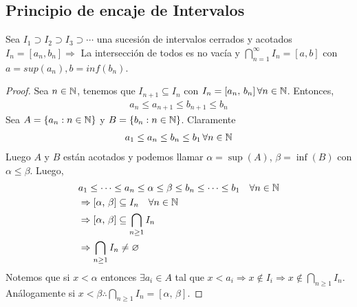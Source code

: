 \subsection{Principio de encaje de Intervalos}

\begin{theorem}
    Sea \(I_1 \supset I_2 \supset I_3 \supset \cdots\) una sucesión de intervalos cerrados y acotados \(I_n = [a_n, b_n] \Rightarrow\)
    La intersección de todos es no vacía y \(\bigcap_{n=1}^{\infty} I_n = [a,b]\) con \(a = sup(a_n), b=inf(b_n)\).
    \begin{proof}
        Sea \(n \in \mathbb{N}\), tenemos que \(I_{n+1} \subseteq I_n\) con \(I_n = [a_n\text{, } b_n] \, \forall n \in \mathbb{N}\). Entonces, \begin{align*}
            a_n \leq a_{n+1} \leq b_{n+1} \leq b_n
        \end{align*}
        Sea \(A = \{ a_n : n \in \mathbb{N} \}\) y \(B = \{ b_n : n \in \mathbb{N} \}\). Claramente \begin{align*}
            a_1 \leq a_n \leq b_n \leq b_1 \, \forall n \in \mathbb{N}
        \end{align*}
        Luego \(A\) y \(B\) están acotados y podemos llamar \(\alpha = \sup(A)\), \(\beta = \inf(B)\) con \(\alpha \leq \beta\). Luego, \begin{align*}
             & a_1 \leq \cdots \leq a_n \leq \alpha \leq \beta \leq b_n \leq \cdots \leq b_1 \quad \forall n \in \mathbb{N} \\
             & \Rightarrow [\alpha\text{, }\beta] \subseteq I_n \quad \forall n \in \mathbb{N}                              \\
             & \Rightarrow [\alpha\text{, }\beta] \subseteq \bigcap_{n \geq 1} I_n                                  \\
             & \Rightarrow \bigcap_{n \geq 1} I_n \neq \varnothing
        \end{align*}
        Notemos que si \(x < \alpha\) entonces \(\exists a_i \in A\) tal que \(x < a_i \Rightarrow x \notin I_i \Rightarrow x \notin \bigcap_{n \geq 1} I_n\).
        Análogamente si \(x < \beta \therefore \bigcap_{n \geq 1} I_n = [\alpha\text{, }\beta]\).
    \end{proof}
\end{theorem}

